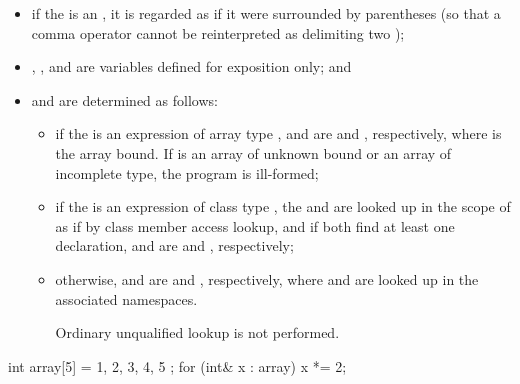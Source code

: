 \begin{itemize}
\item
if the  is an ,
it is regarded as if it were surrounded by parentheses (so that a comma operator
cannot be reinterpreted as delimiting two );

\item {}, , and  are variables defined for
exposition only; and

\item
{} and  are determined as follows:

\begin{itemize}
\item if the  is an expression of
array type ,  and  are
 and  \tcode{+} , respectively,
where  is
the array bound. If  is an array of unknown bound or an array of
incomplete type, the program is ill-formed;

\item if the  is an expression of
class type , the 
 and  are looked up in the scope of 
as if by class member access lookup, and if
both find at least one declaration,  and
 are  and ,
respectively;

\item otherwise,  and  are
 and , respectively,
where  and  are looked
up in the associated namespaces.
\begin{note}
Ordinary unqualified lookup is not
performed.
\end{note}
\end{itemize}
\end{itemize}

\begin{example}
\begin{codeblock}
int array[5] = { 1, 2, 3, 4, 5 };
for (int& x : array)
  x *= 2;
\end{codeblock}
\end{example}


